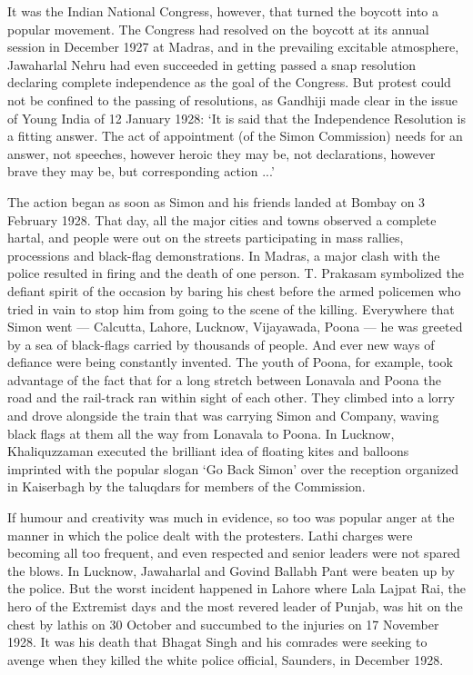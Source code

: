 \begin{multicols}{2}
It was the Indian National Congress, however, that turned the boycott into a popular movement. The Congress had resolved on the boycott at its annual session in December 1927 at Madras, and in the prevailing excitable atmosphere, Jawaharlal Nehru had even succeeded in getting passed a snap resolution declaring complete independence as the goal of the Congress. But protest could not be confined to the passing of resolutions, as Gandhiji made clear in the issue of Young India of 12 January 1928: `It is said that the Independence Resolution is a fitting answer. The act of appointment (of the Simon Commission) needs for an answer, not speeches, however heroic they may be, not declarations, however brave they may be, but corresponding action ...' 

The action began as soon as Simon and his friends landed at Bombay on 3 February 1928. That day, all the major cities and towns observed a complete hartal, and people were out on the streets participating in mass rallies, processions and black-flag demonstrations. In Madras, a major clash with the police resulted in firing and the death of one person. T. Prakasam symbolized the defiant spirit of the occasion by baring his chest before the armed policemen who tried in vain to stop him from going to the scene of the killing. Everywhere that Simon went --- Calcutta, Lahore, Lucknow, Vijayawada, Poona --- he was greeted by a sea of black-flags carried by thousands of people. And ever new ways of defiance were being constantly invented. The youth of Poona, for example, took advantage of the fact that for a long stretch between Lonavala and Poona the road and the rail-track ran within sight of each other. They climbed into a lorry and drove alongside the train that was carrying Simon and Company, waving black flags at them all the way from Lonavala to Poona. In Lucknow, Khaliquzzaman executed the brilliant idea of floating kites and balloons imprinted with the popular slogan `Go Back Simon' over the reception organized in Kaiserbagh by the taluqdars for members of the Commission. 

If humour and creativity was much in evidence, so too was popular anger at the manner in which the police dealt with the protesters. Lathi charges were becoming all too frequent, and even respected and senior leaders were not spared the blows. In Lucknow, Jawaharlal and Govind Ballabh Pant were beaten up by the police. But the worst incident happened in Lahore where Lala Lajpat Rai, the hero of the Extremist days and the most revered leader of Punjab, was hit on the chest by lathis on 30 October and succumbed to the injuries on 17 November 1928. It was his death that Bhagat Singh and his comrades were seeking to avenge when they killed the white police official, Saunders, in December 1928.


\end{multicols}
